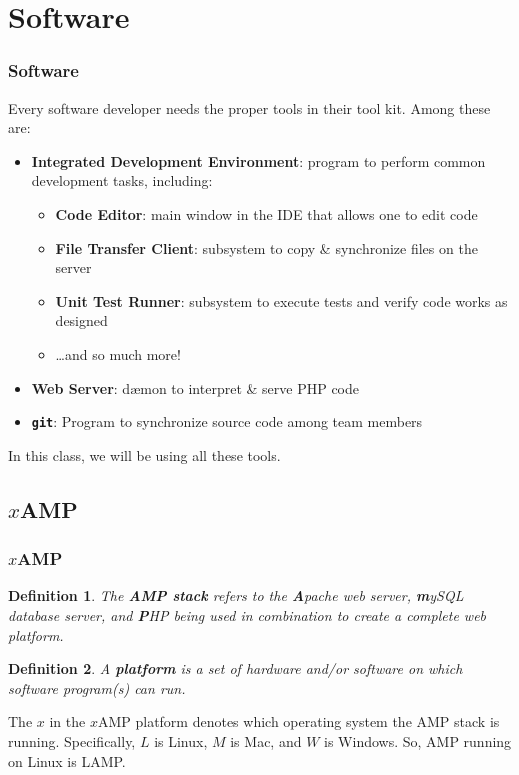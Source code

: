 \documentclass[aspectratio=169]{beamer}
\newtheorem{defn}{Definition}
\begin{document}
\section{Software}
\begin{frame}
\frametitle{Software}
Every software developer needs the proper tools in their tool kit. Among these are:
\begin{itemize}
	\item \textbf{Integrated Development Environment}: program to perform common development tasks, including:
	\begin{itemize}
		\item \textbf{Code Editor}: main window in the IDE that allows one to edit code
		\item \textbf{File Transfer Client}: subsystem to copy \& synchronize files on the server
		\item \textbf{Unit Test Runner}: subsystem to execute tests and verify code works as designed
		\item \dots and so much more!
	\end{itemize}
	\item \textbf{Web Server}: d\ae mon to interpret \& serve PHP code
	\item \textbf{\texttt{git}}: Program to synchronize source code among team members
\end{itemize}
In this class, we will be using all these tools.
\end{frame}

\subsection{$x$AMP}
\begin{frame}
\frametitle{$x$AMP}
\begin{defn}
The \textbf{AMP stack} refers to the \textbf{A}pache web server, \textbf{m}ySQL database server, and \textbf{P}HP being used in combination to create a complete web platform.
\end{defn}
\pause
\begin{defn}
A \textbf{platform} is a set of hardware and/or software on which software program(s) can run.
\end{defn}
\pause
The $x$ in the $x$AMP platform denotes which operating system the AMP stack is running. Specifically, $L$ is Linux, $M$ is Mac, and $W$ is Windows. So, AMP running on Linux is LAMP.
\end{frame}
\end{document}
